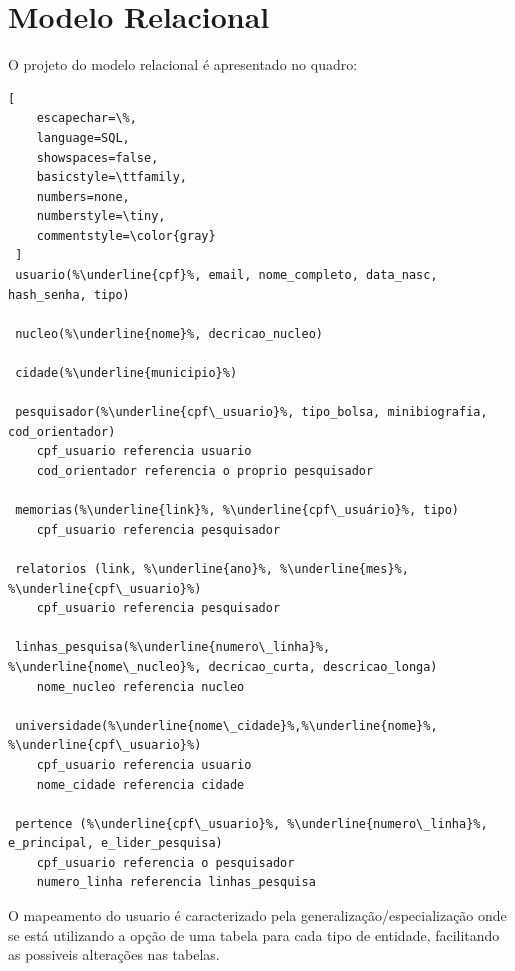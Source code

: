 \documentclass[11pt]{../../classes/ifscarticle}
\begin{document}
\section{Modelo Relacional}
O projeto do modelo relacional é apresentado no quadro:
\begin{lstlisting}[
    escapechar=\%,
    language=SQL,
    showspaces=false,
    basicstyle=\ttfamily,
    numbers=none,
    numberstyle=\tiny,
    commentstyle=\color{gray}
 ]
 usuario(%\underline{cpf}%, email, nome_completo, data_nasc, hash_senha, tipo)

 nucleo(%\underline{nome}%, decricao_nucleo)
 
 cidade(%\underline{municipio}%)

 pesquisador(%\underline{cpf\_usuario}%, tipo_bolsa, minibiografia, cod_orientador)
    cpf_usuario referencia usuario
    cod_orientador referencia o proprio pesquisador

 memorias(%\underline{link}%, %\underline{cpf\_usuário}%, tipo)
    cpf_usuario referencia pesquisador

 relatorios (link, %\underline{ano}%, %\underline{mes}%, %\underline{cpf\_usuario}%)
    cpf_usuario referencia pesquisador

 linhas_pesquisa(%\underline{numero\_linha}%, %\underline{nome\_nucleo}%, decricao_curta, descricao_longa)
    nome_nucleo referencia nucleo

 universidade(%\underline{nome\_cidade}%,%\underline{nome}%, %\underline{cpf\_usuario}%)
    cpf_usuario referencia usuario
    nome_cidade referencia cidade

 pertence (%\underline{cpf\_usuario}%, %\underline{numero\_linha}%, e_principal, e_lider_pesquisa)
    cpf_usuario referencia o pesquisador
    numero_linha referencia linhas_pesquisa
\end{lstlisting}

O mapeamento do usuario é caracterizado pela
generalização/especialização onde se
está utilizando a opção de uma tabela
para cada tipo de entidade, facilitando
as possiveis alterações nas tabelas.
\end{document}
